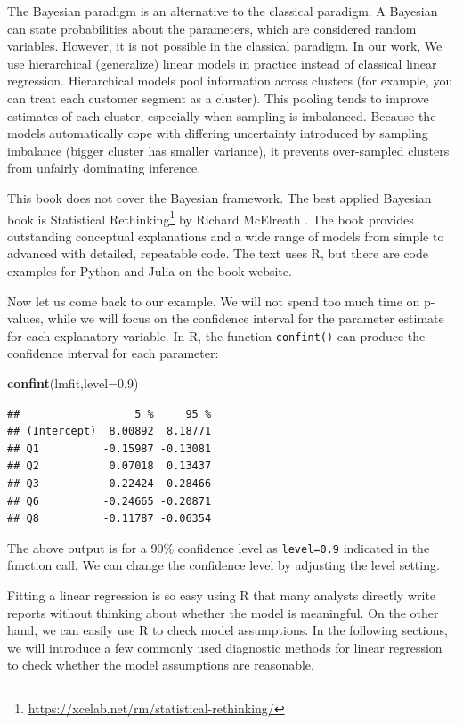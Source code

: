 \documentclass[12pt,]{krantz}
\makeatletter
\newenvironment{Shaded}{\begin{snugshade}}{\end{snugshade}}
\newcommand{\DataTypeTok}[1]{\textcolor[rgb]{0.27,0.27,0.27}{#1}}
\newcommand{\FloatTok}[1]{\textcolor[rgb]{0.06,0.06,0.06}{#1}}
\newcommand{\KeywordTok}[1]{\textcolor[rgb]{0.27,0.27,0.27}{\textbf{#1}}}
\newcommand{\NormalTok}[1]{#1}
\renewcommand{\href}[2]{#2\footnote{\url{#1}}}
\newenvironment{kframe}{%
\medskip{}
\setlength{\fboxsep}{.8em}
 \def\at@end@of@kframe{}%
 \ifinner\ifhmode%
  \def\at@end@of@kframe{\end{minipage}}%
  \begin{minipage}{\columnwidth}%
 \fi\fi%
 \def\FrameCommand##1{\hskip\@totalleftmargin \hskip-\fboxsep
 \colorbox{shadecolor}{##1}\hskip-\fboxsep
     \hskip-\linewidth \hskip-\@totalleftmargin \hskip\columnwidth}%
 \MakeFramed {\advance\hsize-\width
   \@totalleftmargin\z@ \linewidth\hsize
   \@setminipage}}%
 {\par\unskip\endMakeFramed%
 \at@end@of@kframe}
\renewenvironment{Shaded}{\begin{kframe}}{\end{kframe}}
\makeatother
\begin{document}
The Bayesian paradigm is an alternative to the classical paradigm. A Bayesian can state probabilities about the parameters, which are considered random variables. However, it is not possible in the classical paradigm. In our work, We use hierarchical (generalize) linear models in practice instead of classical linear regression. Hierarchical models pool information across clusters (for example, you can treat each customer segment as a cluster). This pooling tends to improve estimates of each cluster, especially when sampling is imbalanced. Because the models automatically cope with differing uncertainty introduced by sampling imbalance (bigger cluster has smaller variance), it prevents over-sampled clusters from unfairly dominating inference.

This book does not cover the Bayesian framework. The best applied Bayesian book is \href{https://xcelab.net/rm/statistical-rethinking/}{Statistical Rethinking} by Richard McElreath \citep{rethinking2020}. The book provides outstanding conceptual explanations and a wide range of models from simple to advanced with detailed, repeatable code. The text uses R, but there are code examples for Python and Julia on the book website.

Now let us come back to our example. We will not spend too much time on p-values, while we will focus on the confidence interval for the parameter estimate for each explanatory variable. In R, the function \texttt{confint()} can produce the confidence interval for each parameter:

\begin{Shaded}
\begin{Highlighting}[]
\KeywordTok{confint}\NormalTok{(lmfit,}\DataTypeTok{level=}\FloatTok{0.9}\NormalTok{)}
\end{Highlighting}
\end{Shaded}

\begin{verbatim}
##                  5 %     95 %
## (Intercept)  8.00892  8.18771
## Q1          -0.15987 -0.13081
## Q2           0.07018  0.13437
## Q3           0.22424  0.28466
## Q6          -0.24665 -0.20871
## Q8          -0.11787 -0.06354
\end{verbatim}

The above output is for a 90\% confidence level as \texttt{level=0.9} indicated in the function call. We can change the confidence level by adjusting the level setting.

Fitting a linear regression is so easy using R that many analysts directly write reports without thinking about whether the model is meaningful. On the other hand, we can easily use R to check model assumptions. In the following sections, we will introduce a few commonly used diagnostic methods for linear regression to check whether the model assumptions are reasonable.
\end{document}
